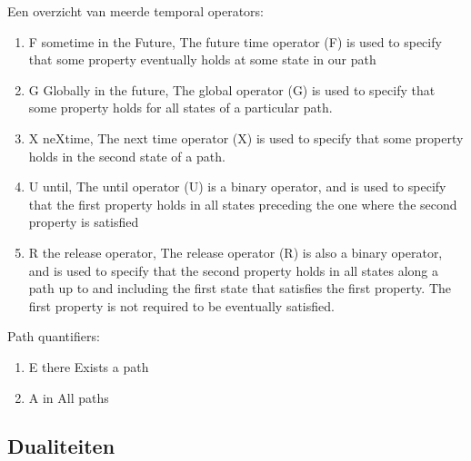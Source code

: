 \documentclass{article}
\begin{document}
	
	Een overzicht van meerde temporal operators:
	\begin{enumerate}
		\item F sometime in the Future, The future time operator (F) is used to specify
		that some property eventually holds at some
		state in our path
		\item G Globally in the future, The global operator (G) is used to specify that
		some property holds for all states of a particular path.
		\item X neXtime, The next time operator (X) is used to specify
		that some property holds in the second state
		of a path.
		\item U until, The until operator (U) is a binary operator,
		and is used to specify that the first property
		holds in all states preceding the one where the
		second property is satisfied
		\item R the release operator, The release operator (R) is also a binary operator, and is used to specify that the second
		property holds in all states along a path up to
		and including the first state that satisfies the
		first property. The first property is not required
		to be eventually satisfied.
	\end{enumerate}
	Path quantifiers: 
	\begin{enumerate}
		\item E there Exists a path
		\item A in All paths
		
	\end{enumerate}
	
	
	\subsection{Dualiteiten}
	
	
\end{document}

